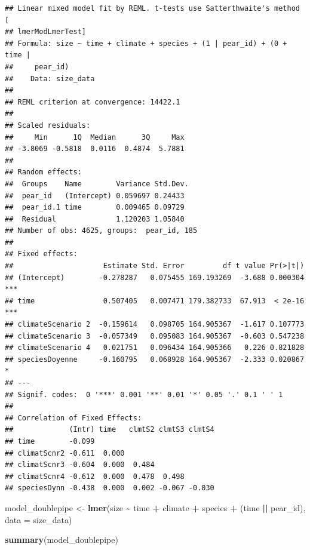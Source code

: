 \documentclass[
]{article}
\newenvironment{Shaded}{\begin{snugshade}}{\end{snugshade}}
\newcommand{\AttributeTok}[1]{\textcolor[rgb]{0.13,0.29,0.53}{#1}}
\newcommand{\FunctionTok}[1]{\textcolor[rgb]{0.13,0.29,0.53}{\textbf{#1}}}
\newcommand{\NormalTok}[1]{#1}
\newcommand{\OtherTok}[1]{\textcolor[rgb]{0.56,0.35,0.01}{#1}}
\newcommand{\SpecialCharTok}[1]{\textcolor[rgb]{0.81,0.36,0.00}{\textbf{#1}}}
\begin{document}
\begin{verbatim}
## Linear mixed model fit by REML. t-tests use Satterthwaite's method [
## lmerModLmerTest]
## Formula: size ~ time + climate + species + (1 | pear_id) + (0 + time |  
##     pear_id)
##    Data: size_data
## 
## REML criterion at convergence: 14422.1
## 
## Scaled residuals: 
##     Min      1Q  Median      3Q     Max 
## -3.8069 -0.5818  0.0116  0.4874  5.7881 
## 
## Random effects:
##  Groups    Name        Variance Std.Dev.
##  pear_id   (Intercept) 0.059697 0.24433 
##  pear_id.1 time        0.009465 0.09729 
##  Residual              1.120203 1.05840 
## Number of obs: 4625, groups:  pear_id, 185
## 
## Fixed effects:
##                     Estimate Std. Error         df t value Pr(>|t|)    
## (Intercept)        -0.278287   0.075455 169.193269  -3.688 0.000304 ***
## time                0.507405   0.007471 179.382733  67.913  < 2e-16 ***
## climateScenario 2  -0.159614   0.098705 164.905367  -1.617 0.107773    
## climateScenario 3  -0.057349   0.095083 164.905367  -0.603 0.547238    
## climateScenario 4   0.021751   0.096434 164.905366   0.226 0.821828    
## speciesDoyenne     -0.160795   0.068928 164.905367  -2.333 0.020867 *  
## ---
## Signif. codes:  0 '***' 0.001 '**' 0.01 '*' 0.05 '.' 0.1 ' ' 1
## 
## Correlation of Fixed Effects:
##             (Intr) time   clmtS2 clmtS3 clmtS4
## time        -0.099                            
## climatScnr2 -0.611  0.000                     
## climatScnr3 -0.604  0.000  0.484              
## climatScnr4 -0.612  0.000  0.478  0.498       
## speciesDynn -0.438  0.000  0.002 -0.067 -0.030
\end{verbatim}

\begin{Shaded}
\begin{Highlighting}[]
\NormalTok{model\_doublepipe }\OtherTok{\textless{}{-}} \FunctionTok{lmer}\NormalTok{(size }\SpecialCharTok{\textasciitilde{}}\NormalTok{ time }\SpecialCharTok{+}\NormalTok{ climate }\SpecialCharTok{+}\NormalTok{ species }\SpecialCharTok{+}\NormalTok{ (time }\SpecialCharTok{||}\NormalTok{ pear\_id), }\AttributeTok{data =}\NormalTok{ size\_data)}

\FunctionTok{summary}\NormalTok{(model\_doublepipe)}
\end{Highlighting}
\end{Shaded}
\end{document}
